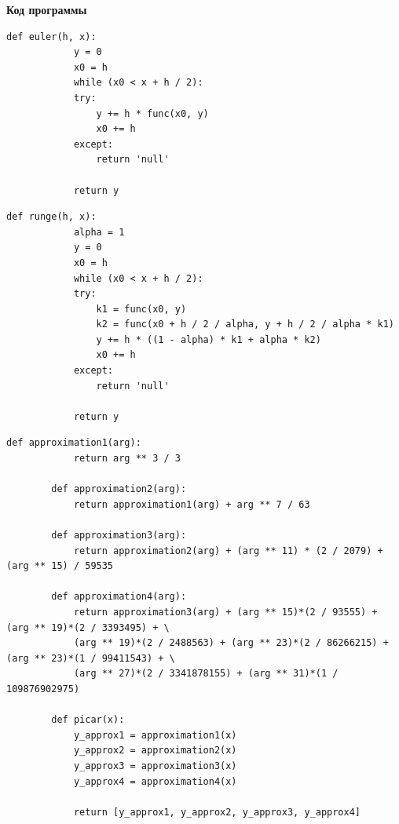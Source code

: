 \documentclass[14pt, a4paper]{extarticle}
\begin{document}
	\textbf{Код программы}

	\begin{lstlisting}[caption=Метод Эйлера]
		def euler(h, x):
			y = 0
			x0 = h
			while (x0 < x + h / 2):
			try:
				y += h * func(x0, y)
				x0 += h
			except:
				return 'null'
		
			return y
	\end{lstlisting}


	\begin{lstlisting}[caption=Метод Рунге-Кутта]
		def runge(h, x):
			alpha = 1
			y = 0
			x0 = h
			while (x0 < x + h / 2):
			try:
				k1 = func(x0, y)
				k2 = func(x0 + h / 2 / alpha, y + h / 2 / alpha * k1)
				y += h * ((1 - alpha) * k1 + alpha * k2)
				x0 += h
			except:
				return 'null'
			
			return y
	\end{lstlisting}

	\begin{lstlisting}[caption=Метод Пикара]
		def approximation1(arg):
			return arg ** 3 / 3
		
		def approximation2(arg):
			return approximation1(arg) + arg ** 7 / 63
		
		def approximation3(arg):
			return approximation2(arg) + (arg ** 11) * (2 / 2079) + (arg ** 15) / 59535
		
		def approximation4(arg):
			return approximation3(arg) + (arg ** 15)*(2 / 93555) + (arg ** 19)*(2 / 3393495) + \
			(arg ** 19)*(2 / 2488563) + (arg ** 23)*(2 / 86266215) + (arg ** 23)*(1 / 99411543) + \
			(arg ** 27)*(2 / 3341878155) + (arg ** 31)*(1 / 109876902975)
		
		def picar(x):
			y_approx1 = approximation1(x)
			y_approx2 = approximation2(x)
			y_approx3 = approximation3(x)
			y_approx4 = approximation4(x)
		
			return [y_approx1, y_approx2, y_approx3, y_approx4]
	\end{lstlisting}
	\newpage
	
\end{document}

